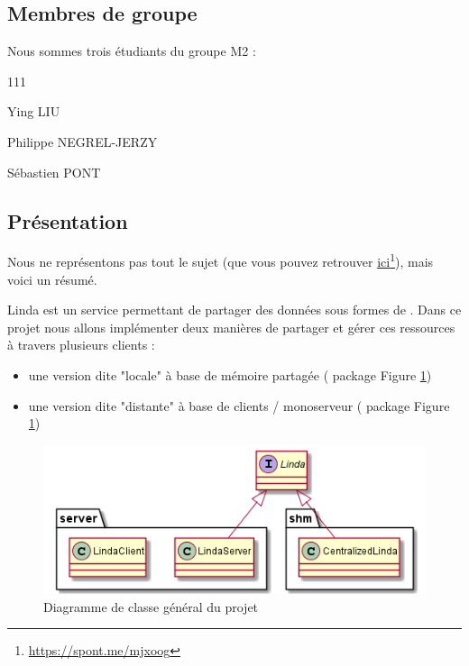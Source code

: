 \subsection{Membres de groupe}

Nous sommes trois étudiants du groupe M2 :
\begin{dinglist}{111}
    \item Ying LIU
    \item Philippe NEGREL-JERZY
    \item Sébastien PONT
\end{dinglist}

\subsection{Présentation}

Nous ne représentons pas tout le sujet (que vous pouvez retrouver \href{https://spont.me/mjxoog}{ici}\footnote{\href{https://spont.me/mjxoog}{https://spont.me/mjxoog}}), mais voici un résumé.

Linda est un service permettant de partager des données sous formes de .
Dans ce projet nous allons implémenter deux manières de partager et gérer ces ressources à travers plusieurs clients :

\begin{itemize}
    \item une version dite "locale" à base de mémoire partagée ( package Figure \ref{fig:main_class_diagram})
    \item une version dite "distante" à base de clients / monoserveur ( package Figure \ref{fig:main_class_diagram})
\end{itemize}

\begin{figure}[H]
    \centering
    \includegraphics[scale=0.7]{src/part-01/mainCD.png}
    \caption{Diagramme de classe général du projet} \label{fig:main_class_diagram}
\end{figure}

